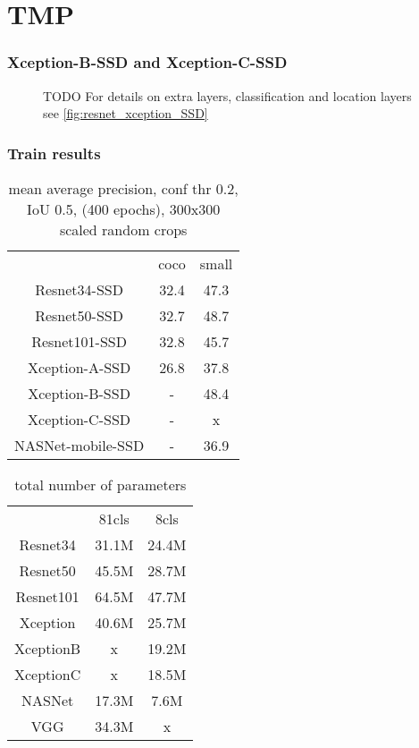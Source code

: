 \chapter{TMP}

\subsection{Xception-B-SSD and Xception-C-SSD }
\begin{figure}
\centering
    \xceptionBSSD
     \caption{TODO For details on extra layers, classification and location layers see \cref{fig:resnet_xception_SSD}}
    \label{fig:xceptionBSSD}
\end{figure}

\subsection{Train results}
\begin{table}
    \begin{tabular}{c|c|c}
                            & coco      & small \\
        Resnet34-SSD        & 32.4      & 47.3  \\
        Resnet50-SSD        & 32.7      & 48.7  \\
        Resnet101-SSD       & 32.8      & 45.7  \\
        Xception-A-SSD      & 26.8      & 37.8  \\
        Xception-B-SSD      & -         & 48.4  \\
        Xception-C-SSD      & -         & x     \\
        NASNet-mobile-SSD   & -         & 36.9  \\
    \end{tabular}
    \caption{mean average precision, conf thr 0.2, IoU 0.5,  (400 epochs), 300x300 scaled random crops}
    \label{tab:map}
\end{table}


\begin{table}
    \begin{tabular}{c|c|c}
                    & 81cls     & 8cls  \\
    Resnet34        & 31.1M     & 24.4M \\
    Resnet50        & 45.5M     & 28.7M \\
    Resnet101       & 64.5M     & 47.7M \\
    Xception        & 40.6M     & 25.7M \\
    XceptionB       & x         & 19.2M \\
    XceptionC       & x         & 18.5M \\
    NASNet          & 17.3M     & 7.6M  \\
    VGG             & 34.3M     & x \\
    \end{tabular}
    \caption{total number of parameters}
    \label{tab:parameters}
\end{table}



